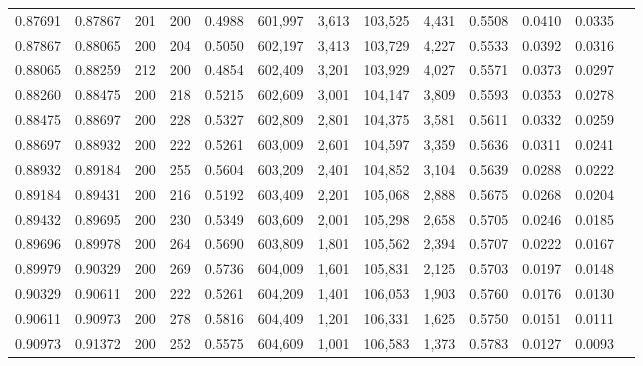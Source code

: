 \begin{tabular}{rrrrrrrrrrrrr}
0.87691 & 0.87867 &   201 & 200 &                                     0.4988 & 601,997 &   3,613 & 103,525 &   4,431 & 0.5508 & 0.0410 & 0.0335 \\
0.87867 & 0.88065 &   200 & 204 &                                     0.5050 & 602,197 &   3,413 & 103,729 &   4,227 & 0.5533 & 0.0392 & 0.0316 \\
0.88065 & 0.88259 &   212 & 200 &                                     0.4854 & 602,409 &   3,201 & 103,929 &   4,027 & 0.5571 & 0.0373 & 0.0297 \\
0.88260 & 0.88475 &   200 & 218 &                                     0.5215 & 602,609 &   3,001 & 104,147 &   3,809 & 0.5593 & 0.0353 & 0.0278 \\
0.88475 & 0.88697 &   200 & 228 &                                     0.5327 & 602,809 &   2,801 & 104,375 &   3,581 & 0.5611 & 0.0332 & 0.0259 \\
0.88697 & 0.88932 &   200 & 222 &                                     0.5261 & 603,009 &   2,601 & 104,597 &   3,359 & 0.5636 & 0.0311 & 0.0241 \\
0.88932 & 0.89184 &   200 & 255 &                                     0.5604 & 603,209 &   2,401 & 104,852 &   3,104 & 0.5639 & 0.0288 & 0.0222 \\
0.89184 & 0.89431 &   200 & 216 &                                     0.5192 & 603,409 &   2,201 & 105,068 &   2,888 & 0.5675 & 0.0268 & 0.0204 \\
0.89432 & 0.89695 &   200 & 230 &                                     0.5349 & 603,609 &   2,001 & 105,298 &   2,658 & 0.5705 & 0.0246 & 0.0185 \\
0.89696 & 0.89978 &   200 & 264 &                                     0.5690 & 603,809 &   1,801 & 105,562 &   2,394 & 0.5707 & 0.0222 & 0.0167 \\
0.89979 & 0.90329 &   200 & 269 &                                     0.5736 & 604,009 &   1,601 & 105,831 &   2,125 & 0.5703 & 0.0197 & 0.0148 \\
0.90329 & 0.90611 &   200 & 222 &                                     0.5261 & 604,209 &   1,401 & 106,053 &   1,903 & 0.5760 & 0.0176 & 0.0130 \\
0.90611 & 0.90973 &   200 & 278 &                                     0.5816 & 604,409 &   1,201 & 106,331 &   1,625 & 0.5750 & 0.0151 & 0.0111 \\
0.90973 & 0.91372 &   200 & 252 &                                     0.5575 & 604,609 &   1,001 & 106,583 &   1,373 & 0.5783 & 0.0127 & 0.0093 \\

\end{tabular}

